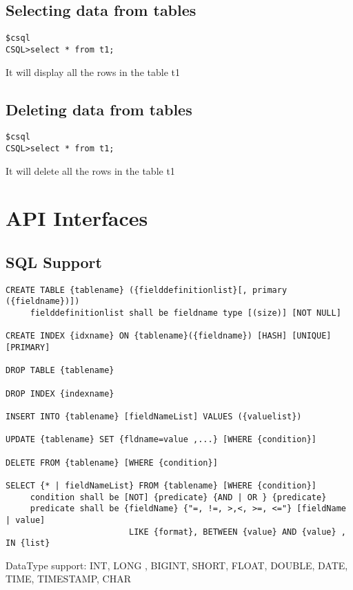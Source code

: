 \documentclass[12pt]{article}
\begin{document}
\subsection{Selecting data from tables}
\label{selectdata}

\begin{verbatim}
$csql
CSQL>select * from t1;
\end{verbatim}
It will display all the rows in the table t1


\subsection{Deleting data from tables}
\label{deletedata}

\begin{verbatim}
$csql
CSQL>select * from t1;
\end{verbatim}
It will delete all the rows in the table t1
\section{API Interfaces}

\subsection{SQL Support}
\label{SQL Syntax Support:}

\begin{verbatim}
CREATE TABLE {tablename} ({fielddefinitionlist}[, primary ({fieldname})]) 
     fielddefinitionlist shall be fieldname type [(size)] [NOT NULL] 

CREATE INDEX {idxname} ON {tablename}({fieldname}) [HASH] [UNIQUE] [PRIMARY]

DROP TABLE {tablename} 

DROP INDEX {indexname} 

INSERT INTO {tablename} [fieldNameList] VALUES ({valuelist}) 

UPDATE {tablename} SET {fldname=value ,...} [WHERE {condition}] 

DELETE FROM {tablename} [WHERE {condition}] 

SELECT {* | fieldNameList} FROM {tablename} [WHERE {condition}] 
     condition shall be [NOT] {predicate} {AND | OR } {predicate} 
     predicate shall be {fieldName} {"=, !=, >,<, >=, <="} [fieldName | value] 
                         LIKE {format}, BETWEEN {value} AND {value} , IN {list} 
\end{verbatim}

DataType support:
INT, LONG , BIGINT, SHORT, 
FLOAT,  DOUBLE, 
DATE, TIME,  TIMESTAMP, 
CHAR 
\end{document}
